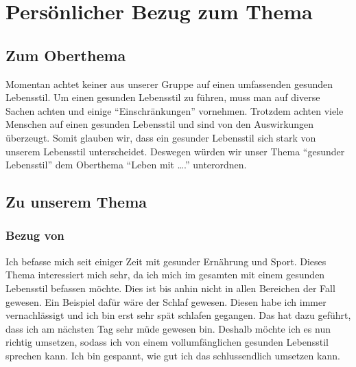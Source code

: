 \chapter{Persönlicher Bezug zum Thema}
\section{Zum Oberthema}
\authortoc{\dario}{\sectionident}
Momentan achtet keiner aus unserer Gruppe auf einen umfassenden gesunden Lebensstil.
Um einen gesunden Lebensstil zu führen, muss man auf diverse Sachen achten und einige “Einschränkungen” vornehmen. Trotzdem achten viele Menschen auf einen gesunden Lebensstil und sind von den Auswirkungen überzeugt. 
Somit glauben wir, dass ein gesunder Lebensstil sich stark von unserem Lebensstil unterscheidet. Deswegen würden wir unser Thema “gesunder Lebensstil” dem Oberthema “Leben mit ….” unterordnen.
\section{Zu unserem Thema}
\subsection{Bezug von \bastian}
\authortoc{\bastian}{\subsectionident}
Ich befasse mich seit einiger Zeit mit gesunder Ernährung und Sport. Dieses Thema interessiert mich sehr, da ich mich im gesamten mit einem gesunden Lebensstil befassen möchte. Dies ist bis anhin nicht in allen Bereichen der Fall gewesen. Ein Beispiel dafür wäre der Schlaf gewesen. Diesen habe ich immer vernachlässigt und ich bin erst sehr spät schlafen gegangen. Das hat dazu geführt, dass ich am nächsten Tag sehr müde gewesen bin. Deshalb möchte ich es nun richtig umsetzen, sodass ich von einem vollumfänglichen gesunden Lebensstil sprechen kann. Ich bin gespannt, wie gut ich das schlussendlich umsetzen kann.
